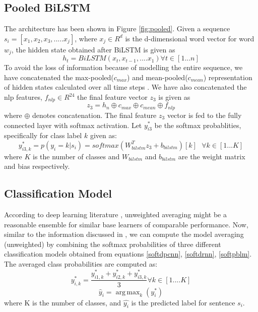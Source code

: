 \documentclass[sigconf]{acmart}
\DeclareMathOperator*{\argmax}{arg\,max}
\begin{document}
\subsection{Pooled BiLSTM}\label{pbilm}
The architecture has been shown in Figure \ref{fig:pooled}. Given a sequence $s_i = [x_{1}, x_{2}, x_{3}, ..... x_{j}]$, where $x_j \in R^d$ is the d-dimensional word vector for word $w_j$, the hidden state obtained after BiLSTM is given as 
\begin{equation}
    h_t = BiLSTM(x_{t}, x_{t-1},.... x_{1}) \forall t \in [1...n]
\end{equation}
\raggedbottom
To avoid the loss of information because of modelling the entire sequence, we have concatenated the max-pooled($c_{max}$) and mean-pooled($c_{mean}$) representation of hidden states calculated over all time steps \cite{RuderH18}. We have also concatenated the nlp features, $f_{nlp} \in R^{24}$ the final feature vector $z_{3}$ is given as
\begin{equation}
    z_3 = h_{n} \oplus c_{max} \oplus c_{mean} \oplus f_{nlp}
\end{equation}
where $\oplus$ denotes concatenation. The final feature $z_3$ vector is fed to the fully connected layer with softmax activation. Let $y_{i3}^*$ be the softmax probablities, specifically for class label $k$ given as:
\begin{equation}
    y_{i3,k}^{*} = p(y_i = k |s_i) = softmax(W_{bilstm}^T z_3 + b_{bilstm})[k]\textrm{ } \forall k \in [1...K]
    \label{softpblm}
\end{equation}
where $K$ is the number of classes and $W_{bilstm}$ and $b_{bilstm}$ are the weight matrix and bias respectively.
\raggedbottom
\subsection{Classification Model}\label{avgm}
According to deep learning literature \cite{simonyan2014very,szegedy2015going,he2016deep}, unweighted averaging might be a reasonable ensemble for similar base learners of comparable performance. Now, similar to the information discussed in \cite{ju2018relative}, we can compute the model averaging (unweighted) by combining the softmax probabilities of three different classification models obtained from equations \ref{softdpcnn}, \ref{softdrnn},  \ref{softpblm}. The averaged class probabilities are computed as:
\begin{equation}
    y_{i,k}^* = \frac{y_{i1,k}^* +  y_{i2,k}^* + y_{i3,k}^*}{3} \forall k \in [1 .... K]    
\end{equation}
\begin{equation}
    \hat{y}_{i}= \argmax_k(y_{i}^*)
\end{equation} 
where K is the number of classes, and $\hat{y_i}$ is the predicted label for sentence $s_i$.
\end{document}
